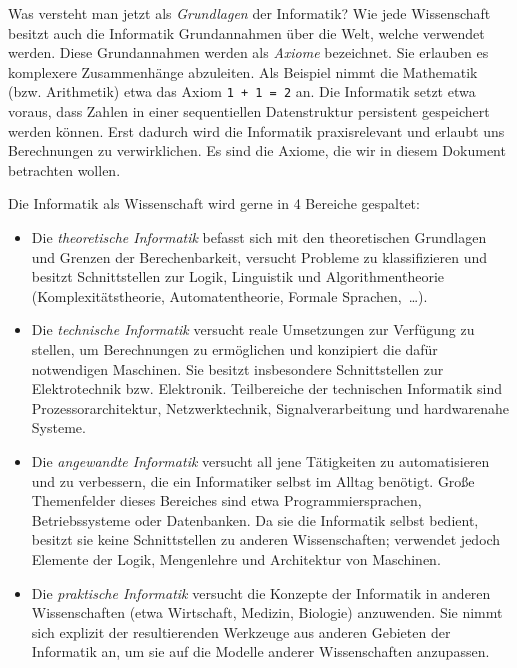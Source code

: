 Was versteht man jetzt als \emph{Grundlagen} der Informatik? Wie jede
Wissenschaft besitzt auch die Informatik Grundannahmen über die Welt,
welche verwendet werden. Diese Grundannahmen werden als \emph{Axiome} bezeichnet.
Sie erlauben es komplexere Zusammenhänge abzuleiten. Als Beispiel nimmt
die Mathematik (bzw. Arithmetik) etwa das Axiom \verb!1 + 1 = 2! an.
Die Informatik setzt etwa voraus, dass Zahlen in einer sequentiellen
Datenstruktur persistent gespeichert werden können. Erst dadurch wird die
Informatik praxisrelevant und erlaubt uns Berechnungen zu verwirklichen.
Es sind die Axiome, die wir in diesem Dokument betrachten wollen.

Die Informatik als Wissenschaft wird gerne in 4 Bereiche gespaltet:
\begin{itemize}
 \item Die \emph{theoretische Informatik} befasst sich mit
        den theoretischen Grundlagen und Grenzen der Berechenbarkeit,
        versucht Probleme zu klassifizieren und besitzt Schnittstellen
        zur Logik, Linguistik und Algorithmentheorie
        (Komplexitätstheorie, Automatentheorie, Formale Sprachen,~\dots).
 \item Die \emph{technische Informatik} versucht
        reale Umsetzungen zur Verfügung zu stellen, um Berechnungen
        zu ermöglichen und konzipiert die dafür notwendigen Maschinen.
        Sie besitzt insbesondere Schnittstellen zur Elektrotechnik bzw.
        Elektronik. Teilbereiche der technischen Informatik sind
        Prozessorarchitektur, Netzwerktechnik, Signalverarbeitung und
        hardwarenahe Systeme.
 \item Die \emph{angewandte Informatik} versucht all jene Tätigkeiten
        zu automatisieren und zu verbessern, die ein Informatiker
        selbst im Alltag benötigt. Große Themenfelder dieses Bereiches sind
        etwa Programmiersprachen, Betriebssysteme oder Datenbanken. Da
        sie die Informatik selbst bedient, besitzt sie keine
        Schnittstellen zu anderen Wissenschaften; verwendet jedoch
        Elemente der Logik, Mengenlehre und Architektur von Maschinen.
  \item Die \emph{praktische Informatik} versucht die Konzepte der
        Informatik in anderen Wissenschaften (etwa Wirtschaft, Medizin,
        Biologie) anzuwenden. Sie nimmt sich explizit der resultierenden
        Werkzeuge aus anderen Gebieten der Informatik an, um sie auf
        die Modelle anderer Wissenschaften anzupassen.
\end{itemize}
